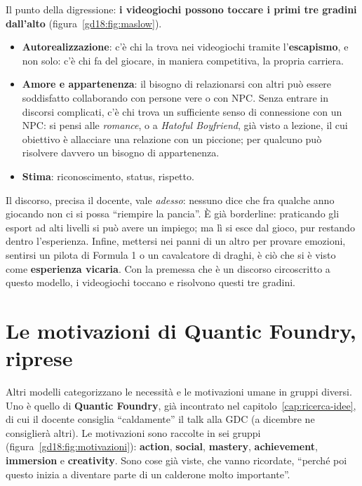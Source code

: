 Il punto della digressione: \textbf{i videogiochi possono toccare i primi tre
gradini dall'alto} (figura~\ref{gd18:fig:maslow}).
\begin{itemize}
  \item \textbf{Autorealizzazione}: c'è chi la trova nei videogiochi tramite
        l'\textbf{escapismo}, e non solo: c'è chi fa del giocare, in maniera
        competitiva, la propria carriera.
  \item \textbf{Amore e appartenenza}: il bisogno di relazionarsi con altri può
        essere soddisfatto collaborando con persone vere o con NPC. Senza entrare in
        discorsi complicati, c'è chi trova un sufficiente senso di connessione con un
        NPC: si pensi alle \emph{romance}, o a \emph{Hatoful Boyfriend}, già visto a
        lezione, il cui obiettivo è allacciare una relazione con un piccione; per
        qualcuno può risolvere davvero un bisogno di appartenenza.
  \item \textbf{Stima}: riconoscimento, status, rispetto.
\end{itemize}
Il discorso, precisa il docente, vale \emph{adesso}: nessuno dice che fra qualche
anno giocando non ci si possa ``riempire la pancia''. È già borderline: praticando
gli esport ad alti livelli si può avere un impiego; ma lì si esce dal gioco, pur
restando dentro l'esperienza. Infine, mettersi nei panni di un altro per provare
emozioni, sentirsi un pilota di Formula 1 o un cavalcatore di draghi, è ciò che si
è visto come \textbf{esperienza vicaria}. Con la premessa che è un discorso
circoscritto a questo modello, i videogiochi toccano e risolvono questi tre gradini.


\section{Le motivazioni di Quantic Foundry, riprese}
\label{gd18:sec:quantic}

Altri modelli categorizzano le necessità e le motivazioni umane in gruppi diversi.
Uno è quello di \textbf{Quantic Foundry}, già incontrato nel
capitolo~\ref{cap:ricerca-idee}, di cui il docente consiglia ``caldamente'' il talk
alla GDC (a dicembre ne consiglierà altri). Le motivazioni sono raccolte in sei
gruppi (figura~\ref{gd18:fig:motivazioni}): \textbf{action}, \textbf{social},
\textbf{mastery}, \textbf{achievement}, \textbf{immersion} e \textbf{creativity}.
Sono cose già viste, che vanno ricordate, ``perché poi questo inizia a diventare
parte di un calderone molto importante''.

